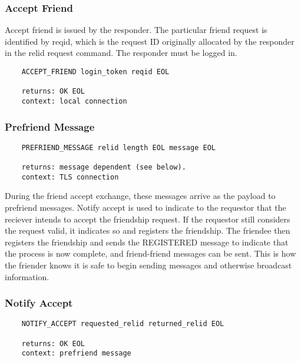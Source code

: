 \documentclass[letterpaper,11pt,oneside]{article}
\begin{document}
\subsubsection{Accept Friend}

Accept friend is issued by the responder. The particular friend request is
identified by reqid, which is the request ID originally allocated by the
responder in the relid request command. The responder must be logged in.

\vspace{10pt}
\begin{verbatim}
    ACCEPT_FRIEND login_token reqid EOL

    returns: OK EOL
    context: local connection
\end{verbatim}
\vspace{10pt}

\subsubsection{Prefriend Message}

\vspace{10pt}
\begin{verbatim}
    PREFRIEND_MESSAGE relid length EOL message EOL

    returns: message dependent (see below).
    context: TLS connection
\end{verbatim}
\vspace{10pt}

During the friend accept exchange, these messages arrive as the payload to
prefriend messages. Notify accept is used to indicate to the requestor that the
reciever intends to accept the friendship request. If the requestor still
considers the request valid, it indicates so and registers the friendship. The
friendee then registers the friendship and sends the REGISTERED message to
indicate that the process is now complete, and friend-friend messages can be
sent. This is how the friender knows it is safe to begin sending messages and
otherwise broadcast information.

\subsubsection{Notify Accept}

\vspace{10pt}
\begin{verbatim}
    NOTIFY_ACCEPT requested_relid returned_relid EOL

    returns: OK EOL
    context: prefriend message
\end{verbatim}
\vspace{10pt}
\end{document}
